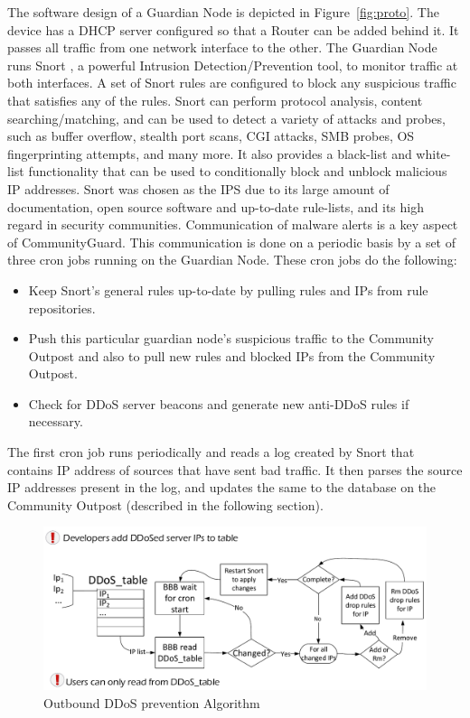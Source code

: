 The software design of a Guardian Node is depicted in Figure~\ref{fig:proto}. The device has a DHCP server configured so that a Router can be added behind it. It passes all traffic from one network interface to the other. The Guardian Node runs Snort \cite{Roesch:1999:SLI:1039834.1039864}, a powerful Intrusion Detection/Prevention tool, to monitor traffic at both interfaces. A set of Snort rules are configured to block any suspicious traffic that satisfies any of the rules. Snort can perform protocol analysis, content searching/matching, and can be used to detect a variety of attacks and probes, such as buffer overflow, stealth port scans, CGI attacks, SMB probes, OS fingerprinting attempts, and many more. It also provides a black-list and white-list functionality that can be used to conditionally block and unblock malicious IP addresses. Snort was chosen as the IPS due to its large amount of documentation, open source software and up-to-date rule-lists, and its high regard in security communities. Communication of malware alerts is a key aspect of CommunityGuard. This communication is done on a periodic basis by a set of three cron jobs running on the Guardian Node. These cron jobs do the following:

\begin{itemize}
    \item Keep Snort's general rules up-to-date by pulling rules and IPs from rule repositories.
    \item Push this particular guardian node's suspicious traffic to the Community Outpost and also to pull new rules and blocked IPs from the Community Outpost.
    \item Check for DDoS server beacons and generate new anti-DDoS rules if necessary.
\end{itemize}

The first cron job runs periodically and reads a log created by Snort that contains IP address of sources that have sent bad traffic. It then parses the source IP addresses present in the log, and updates the same to the database on the Community Outpost (described in the following section).

\begin{figure}
    \centering
    \includegraphics[width=0.95\columnwidth]{figs/ddosserv.pdf}
    \caption{Outbound DDoS prevention Algorithm}
    \label{fig:ddostable}
\end{figure}



